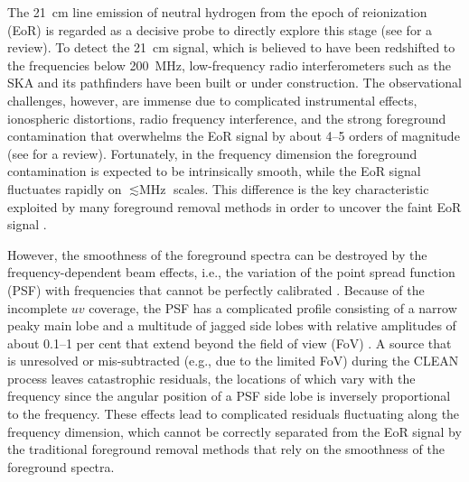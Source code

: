 \documentclass[fleqn,usenatbib]{mnras}
\begin{document}
The \SI{21}{\cm} line emission of neutral hydrogen from the epoch of
reionization (EoR) is regarded as a decisive probe to directly explore
this stage (see \citealt{furlanetto2016rev} for a review).
To detect the \SI{21}{\cm} signal, which is believed to have been
redshifted to the frequencies below \SI{200}{\MHz}, low-frequency
radio interferometers such as the SKA \citep{koopmans2015rev} and its
pathfinders have been built or under construction.
The observational challenges, however, are immense due to
complicated instrumental effects, ionospheric distortions, radio frequency
interference, and the strong foreground contamination that
overwhelms the EoR signal by about \numrange{4}{5} orders of magnitude
(see \citealt{morales2010rev} for a review).
Fortunately, in the frequency dimension the foreground contamination
is expected to be intrinsically smooth, while the EoR signal fluctuates
rapidly on $\lesssim \si{\MHz}$ scales.
This difference is the key characteristic exploited by many
foreground removal methods in order to uncover the faint EoR signal
\citep[e.g.,][]{wang2006,liu2009fgrm,harker2009,wang2013,gu2013}.

However, the smoothness of the foreground spectra can be destroyed by
the frequency-dependent beam effects, i.e., the variation of the point
spread function (PSF) with frequencies that cannot be perfectly
calibrated \citep{liu2009ps}.
Because of the incomplete $uv$ coverage,
the PSF has a complicated profile consisting of a narrow peaky main lobe
and a multitude of jagged side lobes with relative amplitudes of about
\numrange{0.1}{1} per cent that extend beyond the field of view (FoV)
\citep[e.g.,][their figures 1 and 3]{liu2009ps}.
A source that is unresolved or mis-subtracted (e.g., due to the limited
FoV) during the CLEAN process leaves catastrophic residuals,
the locations of which vary with the frequency since the angular
position of a PSF side lobe is inversely proportional to the frequency.
These effects lead to complicated residuals fluctuating along the
frequency dimension, which cannot be correctly separated from the EoR
signal by the traditional foreground removal methods that rely on
the smoothness of the foreground spectra.
\end{document}
